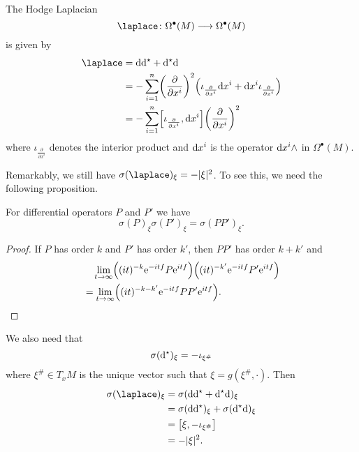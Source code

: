 \begin{example}
  The Hodge Laplacian
  \begin{equation*}
    \laplace \colon \Omega^\bullet (M) \longrightarrow \Omega^\bullet (M)
  \end{equation*}
  is given by
  \begin{align*}
    \laplace 
    &= \drm \drm^\hodge + \drm^\hodge \drm \\
    &= - \sum_{i=1}^n \biggl( \frac{\partial}{\partial x^i} \biggr)^2
    \Bigl( \iota_{\frac{\partial}{\partial x^i}} \drm x^i
    + \drm x^i \iota_{\frac{\partial}{\partial x^i} }\Bigr) \\
    &= - \sum_{i=1}^n
    \Bigl[ \iota_{\frac{\partial}{\partial x^i}}, \drm x^i \Bigr]
    \biggl( \frac{\partial}{\partial x^i} \biggr)^2
  \end{align*}
  where $\iota_{\frac{\partial}{\partial x^i}}$ denotes the interior product and $\mathrm{d} x^i$ is the operator $\mathrm{d} x^i \wedge$ in $\Omega^\bullet (M)$.

  Remarkably, we still have $\sigma(\laplace)_\xi = - |\xi|^2$. To see this, we need the following proposition.
  
  \begin{proposition}
    For differential operators $P$ and $P'$ we have
    \begin{equation*}
      \sigma(P)_\xi \sigma(P')_\xi = \sigma(P P')_\xi.
    \end{equation*}
  \end{proposition}
  \begin{proof}
    If $P$ has order $k$ and $P'$ has order $k'$, then $P P'$ has order $k + k'$ and
    \begin{align*}
      &\quad \lim_{t \to \infty}
      \Bigl( (i t)^{-k} \mathrm{e}^{-i t f} P \mathrm{e}^{i t f} \Bigr)
      \Bigl( (i t)^{-k'} \mathrm{e}^{- i t f} P' \mathrm{e}^{i t f} \Bigr) \\
      &= \lim_{t \to \infty}
      \Bigl( (i t )^{-k-k'} \mathrm{e}^{- i t f} P P' \mathrm{e}^{i t f} \Bigr).
    \end{align*}
  \end{proof}

  We also need that
  \begin{equation*}
    \sigma( \mathrm{d}^{\star})_\xi = - \iota_{\xi^\#}
  \end{equation*}
  where $\xi^\# \in T_x M$ is the unique vector such that $\xi = g(\xi^\#, \cdot)$. Then
  \begin{align*}
    \sigma(\laplace)_\xi
    &= \sigma(\drm \drm^\hodge + \drm^\hodge \drm)_\xi \\
    &= \sigma(\drm \drm^\hodge)_\xi + \sigma (\drm^\hodge \drm)_\xi \\
    &= \bigl[\xi, - \iota_{\xi^\#}\bigr] \\
    &= - | \xi |^2.
  \end{align*}
\end{example}

